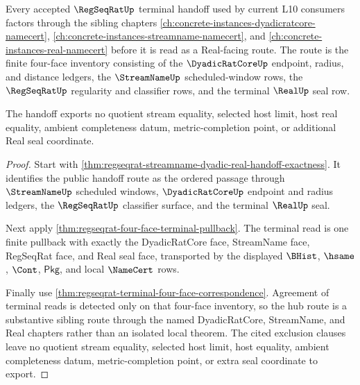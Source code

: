 \begin{theorem}
\label{thm:regseqrat-four-face-hub-sibling-route}
Every accepted $\RegSeqRatUp$ terminal handoff used by current L10 consumers factors through the sibling chapters \autoref{ch:concrete-instances-dyadicratcore-namecert}, \autoref{ch:concrete-instances-streamname-namecert}, and \autoref{ch:concrete-instances-real-namecert} before it is read as a Real-facing route. The route is the finite four-face inventory consisting of the $\DyadicRatCoreUp$ endpoint, radius, and distance ledgers, the $\StreamNameUp$ scheduled-window rows, the $\RegSeqRatUp$ regularity and classifier rows, and the terminal $\RealUp$ seal row.

The handoff exports no quotient stream equality, selected host limit, host real equality, ambient completeness datum, metric-completion point, or additional Real seal coordinate.
\end{theorem}
\begin{proof}
Start with \autoref{thm:regseqrat-streamname-dyadic-real-handoff-exactness}. It identifies the public handoff route as the ordered passage through $\StreamNameUp$ scheduled windows, $\DyadicRatCoreUp$ endpoint and radius ledgers, the $\RegSeqRatUp$ classifier surface, and the terminal $\RealUp$ seal.

Next apply \autoref{thm:regseqrat-four-face-terminal-pullback}. The terminal read is one finite pullback with exactly the DyadicRatCore face, StreamName face, RegSeqRat face, and Real seal face, transported by the displayed $\BHist$, $\hsame$, $\Cont$, $\mathsf{Pkg}$, and local $\NameCert$ rows.

Finally use \autoref{thm:regseqrat-terminal-four-face-correspondence}. Agreement of terminal reads is detected only on that four-face inventory, so the hub route is a substantive sibling route through the named DyadicRatCore, StreamName, and Real chapters rather than an isolated local theorem. The cited exclusion clauses leave no quotient stream equality, selected host limit, host equality, ambient completeness datum, metric-completion point, or extra seal coordinate to export.
\end{proof}
